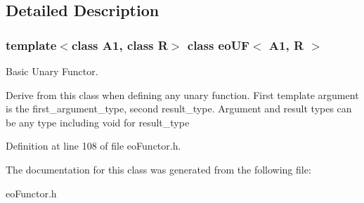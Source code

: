 \subsection{Detailed Description}
\subsubsection*{template$<$class A1, class R$>$ class eo\-UF$<$ A1, R $>$}

Basic Unary Functor. 

Derive from this class when defining any unary function. First template argument is the first\_\-argument\_\-type, second result\_\-type. Argument and result types can be any type including void for result\_\-type 



Definition at line 108 of file eo\-Functor.h.

The documentation for this class was generated from the following file:\begin{CompactItemize}
\item 
eo\-Functor.h\end{CompactItemize}
